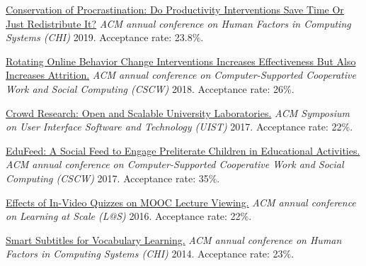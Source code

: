\href{https://hci.stanford.edu/publications/2019/conservation/conservation-chi2019.pdf}{Conservation of Procrastination: Do Productivity Interventions Save Time Or Just Redistribute It?} \emph{ACM annual conference on Human Factors in Computing Systems (CHI)} 2019. Acceptance rate: 23.8\%. %


\href{https://hci.stanford.edu/publications/2018/habitlab/habitlab-cscw18.pdf}{Rotating Online Behavior Change Interventions Increases Effectiveness But Also Increases Attrition.} \emph{ACM annual conference on Computer-Supported Cooperative Work and Social Computing (CSCW)} 2018. Acceptance rate: 26\%.

\href{https://hci.stanford.edu/publications/2017/crowdresearch/crowd-research-uist2017.pdf}{Crowd Research: Open and Scalable University Laboratories.} \emph{ACM Symposium on User Interface Software and Technology (UIST)} 2017. Acceptance rate: 22\%.

\href{https://www.microsoft.com/en-us/research/wp-content/uploads/2016/10/edufeed.pdf}{EduFeed: A Social Feed to Engage Preliterate Children in Educational Activities.} \emph{ACM annual conference on Computer-Supported Cooperative Work and Social Computing (CSCW)} 2017. Acceptance rate: 35\%.

\href{https://hci.stanford.edu/publications/2016/invideo/invideo-las2016.pdf}{Effects of In-Video Quizzes on MOOC Lecture Viewing.} \emph{ACM annual conference on Learning at Scale (L@S)} 2016. Acceptance rate: 22\%.

\href{https://up.csail.mit.edu/other-pubs/chi2014-smartsubs.pdf}{Smart Subtitles for Vocabulary Learning.} \emph{ACM annual conference on Human Factors in Computing Systems (CHI)} 2014. Acceptance rate: 23\%.



